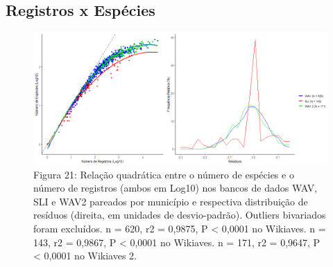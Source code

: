 \subsection {Registros x Espécies}

\begin{figure}[h!]
\centering
\includegraphics[width = 15cm]{Imagens/4333.png}
\\{\scriptsize Figura 21: Relação quadrática entre o número de espécies e o número de registros (ambos em Log10) nos bancos de dados WAV, SLI e WAV2 pareados por município e respectiva distribuição de resíduos (direita, em unidades de desvio-padrão). Outliers bivariados foram excluídos. n = 620, r2 = 0,9875, P < 0,0001 no Wikiaves. n = 143, r2 = 0,9867, P < 0,0001 no Wikiaves. n = 171, r2 = 0,9647, P < 0,0001 no Wikiaves 2.}
\label{Figura 20}
\end{figure}

\newpage
